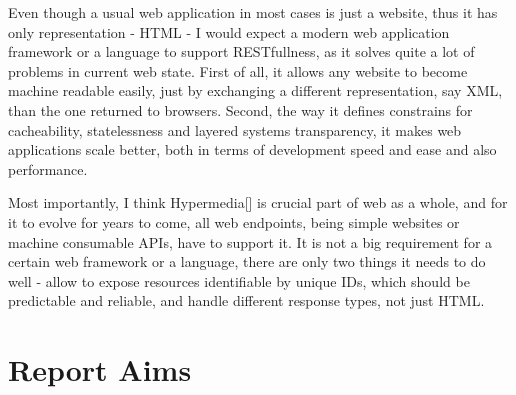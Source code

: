 Even though a usual web application in most cases is just a website, thus it has only representation - HTML - I would expect a modern web application framework or a language to support RESTfullness, as it solves quite a lot of problems in current web state. First of all, it allows any website to become machine readable easily, just by exchanging a different representation, say XML, than the one returned to browsers. Second, the way it defines constrains for cacheability, statelessness and layered systems transparency, it makes web applications scale better, both in terms of development speed and ease and also performance. 

Most importantly, I think Hypermedia[] is crucial part of web as a whole, and for it to evolve for years to come, all web endpoints, being simple websites or machine consumable APIs, have to support it. It is not a big requirement for a certain web framework or a language, there are only two things it needs to do well - allow to expose resources identifiable by unique IDs, which should be predictable and reliable, and handle different response types, not just HTML. 

\section{Report Aims}

